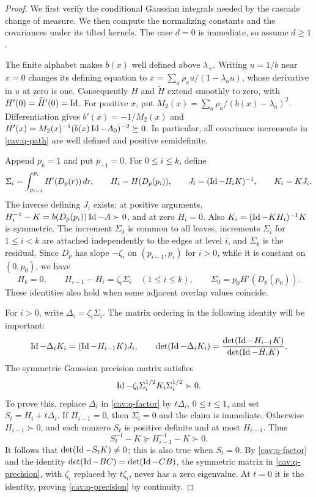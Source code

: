 \begin{proof}
We first verify the conditional Gaussian integrals needed by the cascade
change of measure.  We then compute the normalizing constants and the
covariances under its tilted kernels.  The case $d=0$ is immediate, so
assume $d\geq1$.

The finite alphabet makes $b(x)$ well defined above $\lambda_+$.
Writing $u=1/b$ near $x=0$ changes its defining equation to
$x=\sum_a\rho_a u/(1-\lambda_a u)$, whose derivative in $u$ at zero
is one.  Consequently $H$ and $\widetilde H$ extend smoothly to zero,
with $H'(0)=\widetilde H'(0)=\operatorname{Id}$.  For positive $x$, put
$M_2(x)=\sum_a\rho_a/(b(x)-\lambda_a)^2$.  Differentiation gives
$b'(x)=-1/M_2(x)$ and
$H'(x)=M_2(x)^{-1}(b(x)\operatorname{Id}-A_0)^{-2}\succeq0$.
In particular, all covariance increments in \eqref{cav:q-path}
are well defined and positive semidefinite.

Append $p_k=1$ and put $p_{-1}=0$.  For $0\leq i\leq k$, define
\begin{equation}\label{cav:q-increments}
 \Sigma_i=\int_{p_{i-1}}^{p_i}H'(D_p(r))\,dr,
 \qquad H_i=H(D_p(p_i)),\qquad
 J_i=(\operatorname{Id}-H_iK)^{-1},\qquad K_i=KJ_i.
\end{equation}
The inverse defining $J_i$ exists: at positive arguments,
$H_i^{-1}-K=b(D_p(p_i))\operatorname{Id}-A\succ0$, and at zero $H_i=0$.
Also $K_i=(\operatorname{Id}-KH_i)^{-1}K$ is symmetric.
The increment $\Sigma_0$ is common to all leaves, increments
$\Sigma_i$ for $1\leq i<k$ are attached independently to the edges
at level $i$, and $\Sigma_k$ is the residual.  Since $D_p$ has slope
$-\zeta_i$ on $(p_{i-1},p_i)$ for $i>0$, while it is constant
on $(0,p_0)$, we have
\begin{equation}\label{cav:q-levels}
 H_k=0,\qquad
 H_{i-1}-H_i=\zeta_i\Sigma_i\quad(1\leq i\leq k),
 \qquad
 \Sigma_0=p_0H'(D_p(p_0)).
\end{equation}
These identities also hold when some adjacent overlap values coincide.

For $i>0$, write $\Delta_i=\zeta_i\Sigma_i$.  The matrix ordering
in the following identity will be important:
\begin{equation}\label{cav:q-factor}
 \operatorname{Id}-\Delta_iK_i=(\operatorname{Id}-H_{i-1}K)J_i,
 \qquad
 \det(\operatorname{Id}-\Delta_iK_i)
   =\frac{\det(\operatorname{Id}-H_{i-1}K)}{\det(\operatorname{Id}-H_iK)}.
\end{equation}
The symmetric Gaussian precision matrix satisfies
\begin{equation}\label{cav:q-precision}
 \operatorname{Id}-\zeta_i\Sigma_i^{1/2}K_i\Sigma_i^{1/2}\succ0.
\end{equation}
To prove this, replace $\Delta_i$ in \eqref{cav:q-factor} by
$t\Delta_i$, $0\leq t\leq1$, and set $S_t=H_i+t\Delta_i$.
If $H_{i-1}=0$, then $\Sigma_i=0$ and the claim is immediate.
Otherwise $H_{i-1}\succ0$, and each nonzero $S_t$ is positive
definite and at most $H_{i-1}$.  Thus
\[
 S_t^{-1}-K\succeq H_{i-1}^{-1}-K\succ0.
\]
It follows that $\det(\operatorname{Id}-S_tK)\ne0$; this is also true when
$S_t=0$.  By \eqref{cav:q-factor} and the identity
$\det(\operatorname{Id}-BC)=\det(\operatorname{Id}-CB)$, the symmetric matrix in
\eqref{cav:q-precision}, with $\zeta_i$ replaced by $t\zeta_i$,
never has a zero eigenvalue.  At $t=0$ it is the identity, proving
\eqref{cav:q-precision} by continuity.


\end{proof}
